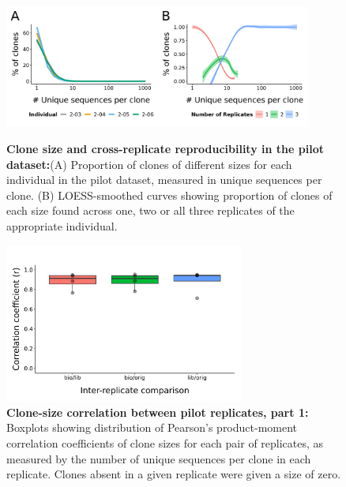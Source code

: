 \begin{figure}
\centering
\includegraphics[width = 0.9\textwidth]{_Figures/png/pilot-clone-sizes}
\begin{subfigure}{0em}
\label{fig:igseq-pilot-clone-sizes-sizes}
\end{subfigure}
\begin{subfigure}{0em}
\label{fig:igseq-pilot-clone-sizes-reps}
\end{subfigure}
\caption[Clone size and cross-replicate reproducibility in the \igseq pilot dataset]{\textbf{Clone size and cross-replicate reproducibility in the \igseq pilot dataset:}(A) Proportion of clones of different sizes for each individual in the pilot dataset, measured in unique sequences per clone. (B) LOESS-smoothed curves \parencite{cleveland1992loess} showing proportion of clones of each size found across one, two or all three replicates of the appropriate individual.}
\label{fig:igseq-pilot-clone-sizes}
\end{figure}

\begin{figure}
\centering
\includegraphics[width = 0.7\textwidth]{_Figures/png/pilot-clone-sizes-cor-boxplots}
\caption[Clone-size correlation between pilot replicates, part 1]{\textbf{Clone-size correlation between pilot replicates, part 1:} Boxplots showing distribution of Pearson's product-moment correlation coefficients of clone sizes for each pair of replicates, as measured by the number of unique sequences per clone in each replicate. Clones absent in a given replicate were given a size of zero.}
\label{fig:igseq-pilot-clone-sizes-cor-boxplots}
\end{figure}

